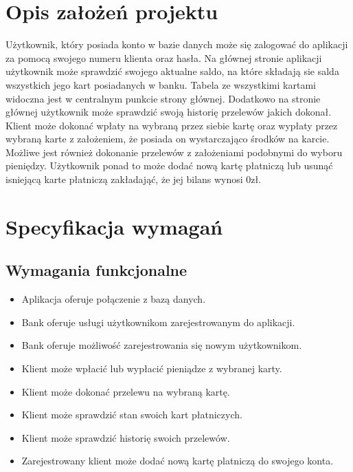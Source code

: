\documentclass[12pt, letterpaper]{article}
\begin{document}
\newpage

\tableofcontents

\newpage

\section{Opis założeń projektu}

\quad Użytkownik, który posiada konto w bazie danych może się zalogować do aplikacji za pomocą swojego numeru klienta oraz hasła. Na głównej stronie aplikacji użytkownik może sprawdzić swojego aktualne saldo, na które składają sie salda wszystkich jego kart posiadanych w banku. Tabela ze wszystkimi kartami widoczna jest w centralnym punkcie strony głównej. Dodatkowo na stronie głównej użytkownik może sprawdzić swoją historię przelewów jakich dokonał. Klient może dokonać wpłaty na wybraną przez siebie kartę oraz wypłaty przez wybraną karte z założeniem, że posiada on wystarczająco środków na karcie. Możliwe jest również dokonanie przelewów z założeniami podobnymi do wyboru pieniędzy. Użytkownik ponad to może dodać nową kartę płatniczą lub usunąć isniejącą karte płatniczą zakładająć, że jej bilans wynosi 0zł.

\section{Specyfikacja wymagań}

\subsection{Wymagania funkcjonalne}
\begin{itemize}
\item Aplikacja oferuje połączenie z bazą danych.
\item Bank oferuje usługi użytkownikom zarejestrowanym do aplikacji.
\item Bank oferuje możliwość zarejestrowania się nowym użytkownikom.
\item Klient może wpłacić lub wypłacić pieniądze z wybranej karty.
\item Klient może dokonać przelewu na wybraną kartę.
\item Klient może sprawdzić stan swoich kart płatniczych.
\item Klient może sprawdzić historię swoich przelewów.
\item Zarejestrowany klient może dodać nową kartę platniczą do swojego konta.
\end{itemize}
\end{document}

